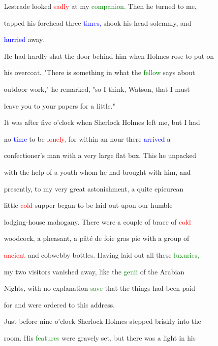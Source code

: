  Lestrade looked \textcolor{red}{sadly} at my \textcolor{green}{companion.} Then he turned to me,

 tapped his forehead three \textcolor{blue}{times,} shook his head solemnly, and

 \textcolor{blue}{hurried} away.



 He had hardly shut the door behind him when Holmes rose to put on

 his overcoat. "There is something in what the \textcolor{green}{fellow} says about

 outdoor work," he remarked, "so I think, Watson, that I must

 \textcolor{BurntOrange}{leave} you to your papers for a little."



 It was after five o'clock when Sherlock Holmes left me, but I had

 no \textcolor{blue}{time} to be \textcolor{red}{lonely,} for within an hour there \textcolor{blue}{arrived} a

 confectioner's man with a very large flat box. This he unpacked

 with the help of a \textcolor{BurntOrange}{youth} whom he had brought with him, and

 presently, to my very great \textcolor{BurntOrange}{astonishment,} a quite epicurean

 little \textcolor{red}{cold} supper began to be laid out upon our \textcolor{BurntOrange}{humble}

 lodging-house mahogany. There were a couple of brace of \textcolor{red}{cold}

 woodcock, a pheasant, a pâté de foie gras pie with a group of

 \textcolor{red}{ancient} and cobwebby bottles. Having laid out all these \textcolor{green}{luxuries,}

 my two \textcolor{BurntOrange}{visitors} \textcolor{BurntOrange}{vanished} away, like the \textcolor{green}{genii} of the Arabian

 Nights, with no explanation \textcolor{green}{save} that the things had been paid

 for and were ordered to this address.



 Just before nine o'clock Sherlock Holmes stepped briskly into the

 room. His \textcolor{green}{features} were gravely set, but there was a light in his

